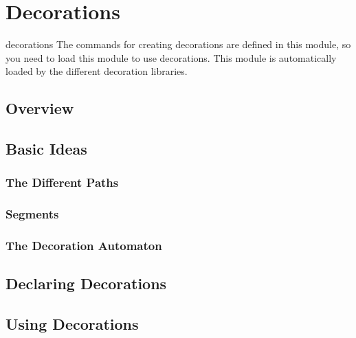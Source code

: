 %
%
%

\section{Decorations}
\label{section-base-snakes-and-decorations}


\begin{pgfmodule}{decorations}
  The commands for creating decorations are defined in this
  module, so you need to load this module to use decorations. This
  module is automatically loaded by the different decoration
  libraries. 
\end{pgfmodule}


\subsection{Overview}

\subsection{Basic Ideas}

\subsubsection{The Different Paths}

\subsubsection{Segments}

\subsubsection{The Decoration Automaton}

\subsection{Declaring Decorations}

\subsection{Using Decorations}







